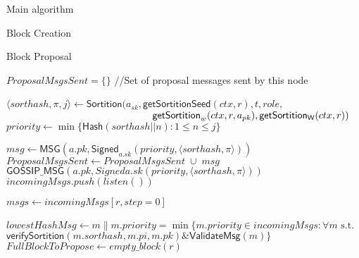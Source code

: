 \documentclass[10pt,a4paper]{article}
\begin{document}
\begin{section}{Main algorithm}
\begin{subsection}{Block Creation}
\end{subsection}
\begin{subsection}{Block Proposal}\label{ssect:blockproposal}

\begin{algorithm}
    \begin{algorithmic}[1]
        \State $ProposalMsgsSent = \{\}$ //Set of proposal messages sent by this node

            \State $\langle sorthash, \pi, j\rangle\gets 
            \mathsf{Sortition}(
                a_{sk}, 
                \mathsf{getSortitionSeed}(ctx, r), 
                t, 
                role, $ \newline
                ${}$ ${\hskip 5.2cm}\mathsf{getSortition}_w(ctx, r, a_{pk}), 
                \mathsf{getSortition_W}(ctx, r)
            )$
                \State $priority \gets \min\{\mathsf{Hash}(sorthash || n):1\le n\le j\}$

                \State $msg \gets \mathsf{MSG}(a.pk, \mathsf{Signed}_{a.sk}(priority, \langle sorthash, \pi\rangle))$
                \State $ProposalMsgsSent \gets  ProposalMsgsSent\;\cup\;msg$
                \State $\mathsf{GOSSIP\_MSG}(a.pk, Signed{a.sk}(priority, \langle sorthash, \pi\rangle))$
            \EndIf
        \EndFor \\

            \State $incomingMsgs.push(listen())$
        \EndWhile

        \State $msgs \gets incomingMsgs[r, step=0]$

        \State $lowestHashMsg \gets m \| m.priority = \min \{m.priority \in incomingMsgs : \forall m \text{ s.t. } $\newline
        ${}$ {\hskip 3cm}  $\mathsf{verifySortition}(m.sorthash, m.pi, m.pk) \& \mathsf{ValidateMsg}(m) \}$ \\

        \State $FullBlockToPropose \gets empty\_block(r)$ 


\end{algorithmic}
\end{algorithm}
\end{subsection}
\end{section}
\end{document}
